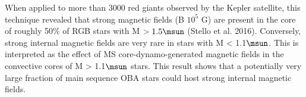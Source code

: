 When applied to more than 3000 red giants observed by the Kepler satellite, this technique revealed that
strong magnetic fields (B $ 10^5$ G) are present in the core of roughly 50\% of RGB stars with M $> 1.5\msun$ (Stello et al. 2016).
Conversely, strong internal magnetic fields are very rare in stars with M < 1.1$\msun$. This is interpreted as the
effect of MS core-dynamo-generated magnetic fields in the convective cores of M > 1.1$\msun$ stars.
This result shows that a potentially very large fraction of main sequence OBA stars could host strong internal magnetic fields.




